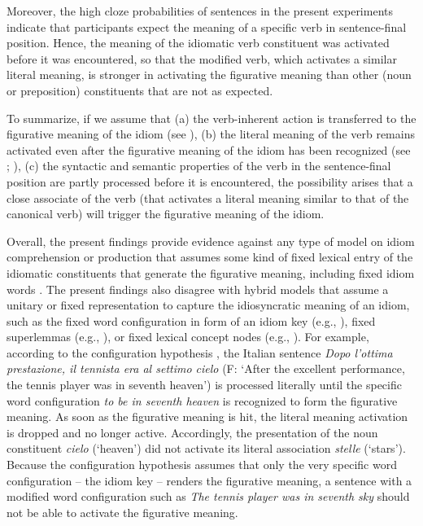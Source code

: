 \documentclass[output=paper]{langsci/langscibook}
\begin{document}
Moreover, the high cloze probabilities of sentences in the present experiments indicate that participants expect the meaning of a specific verb in sentence-final position. Hence, the meaning of the idiomatic verb constituent was activated before it was encountered, so that the modified verb, which activates a similar literal meaning, is stronger in activating the figurative meaning than other (noun or preposition) constituents that are not as expected. 


To summarize, if we assume that (a) the verb-inherent action is transferred to the figurative meaning of the idiom (see \citealt{hamblin:1999}), (b) the literal meaning of the verb remains activated even after the figurative meaning of the idiom has been recognized (see \citealt{rabanus:2008}; \citealt{smolka:2007}), (c) the syntactic and semantic properties of the verb in the sentence-final position are partly processed before it is encountered, the possibility arises that a close associate of the verb (that activates a literal meaning similar to that of the canonical verb) will trigger the figurative meaning of the idiom.  


Overall, the present findings provide evidence against any type of model on idiom comprehension or production that assumes some kind of fixed lexical entry of the idiomatic constituents that generate the figurative meaning, including fixed idiom words \citep{bobrow:1973}. The present findings also disagree with hybrid models that assume a unitary or fixed representation to capture the idiosyncratic meaning of an idiom, such as the fixed word configuration in form of an idiom key (e.g., \citealt{cacciari:1988}), fixed superlemmas (e.g., \citealt{sprenger:2006}), or fixed lexical concept nodes (e.g., \citealt{cutting:1997}). For example, according to the configuration hypothesis \citep{cacciari:1988}, the Italian sentence \textit{Dopo l’ottima prestazione, il tennista era al settimo cielo} (F: `After the excellent performance, the tennis player was in seventh heaven') is processed literally until the specific word configuration \textit{to be in seventh heaven} is recognized to form the figurative meaning. As soon as the figurative meaning is hit, the literal meaning activation is dropped and no longer active. Accordingly, the presentation of the noun constituent \textit{cielo} (‘heaven’) did not activate its literal association \textit{stelle} (‘stars’). Because the configuration hypothesis assumes that only the very specific word configuration -- the idiom key -- renders the figurative meaning, a sentence with a modified word configuration such as \textit{The tennis player was in seventh sky} should not be able to activate the figurative meaning. 
\end{document}
